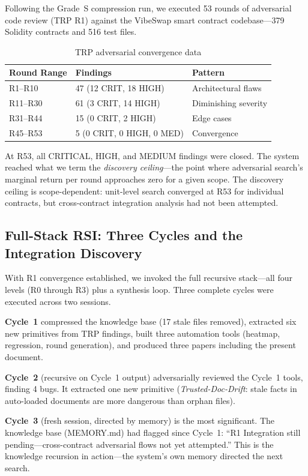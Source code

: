\documentclass[11pt, a4paper]{article}
\begin{document}
Following the Grade~S compression run, we executed 53 rounds of adversarial code review (TRP R1) against the VibeSwap smart contract codebase---379 Solidity contracts and 516 test files.

\begin{table}[h]
\centering
\caption{TRP adversarial convergence data}
\label{tab:trp-convergence}
\begin{tabular}{@{}lll@{}}
\toprule
\textbf{Round Range} & \textbf{Findings} & \textbf{Pattern} \\
\midrule
R1--R10 & 47 (12 CRIT, 18 HIGH) & Architectural flaws \\
R11--R30 & 61 (3 CRIT, 14 HIGH) & Diminishing severity \\
R31--R44 & 15 (0 CRIT, 2 HIGH) & Edge cases \\
R45--R53 & 5 (0 CRIT, 0 HIGH, 0 MED) & Convergence \\
\bottomrule
\end{tabular}
\end{table}

At R53, all CRITICAL, HIGH, and MEDIUM findings were closed. The system reached what we term the \emph{discovery ceiling}---the point where adversarial search's marginal return per round approaches zero for a given scope. The discovery ceiling is scope-dependent: unit-level search converged at R53 for individual contracts, but cross-contract integration analysis had not been attempted.

\subsection{Full-Stack RSI: Three Cycles and the Integration Discovery}

With R1 convergence established, we invoked the full recursive stack---all four levels (R0 through R3) plus a synthesis loop. Three complete cycles were executed across two sessions.

\textbf{Cycle~1} compressed the knowledge base (17 stale files removed), extracted six new primitives from TRP findings, built three automation tools (heatmap, regression, round generation), and produced three papers including the present document.

\textbf{Cycle~2} (recursive on Cycle~1 output) adversarially reviewed the Cycle~1 tools, finding 4 bugs. It extracted one new primitive (\emph{Trusted-Doc-Drift}: stale facts in auto-loaded documents are more dangerous than orphan files).

\textbf{Cycle~3} (fresh session, directed by memory) is the most significant. The knowledge base (MEMORY.md) had flagged since Cycle~1: ``R1 Integration still pending---cross-contract adversarial flows not yet attempted.'' This is the knowledge recursion in action---the system's own memory directed the next search.
\end{document}
